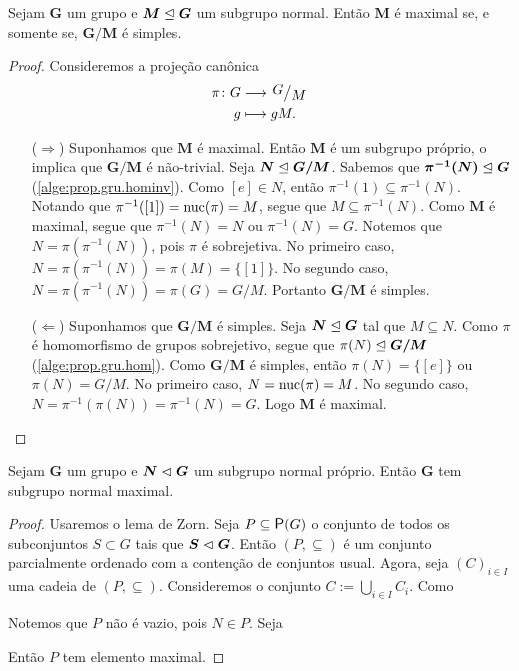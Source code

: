 \begin{proposition}
Sejam $\bm G$ um grupo e $\bm M \mathrel{\unlhd} \bm G$ um subgrupo normal. Então $\bm M$ é maximal se, e somente se, $\bm{G/M}$ é simples.
\end{proposition}
\begin{proof} Consideremos a projeção canônica
	\begin{align*}
	\func{\pi}{G}{\quo{G}{M}}{g}{gM}.
	\end{align*}
	\begin{enumerate}
		\item [($\Rightarrow$)] Suponhamos que $\bm M$ é maximal. Então $\bm M$ é um subgrupo próprio, o implica que $\bm{G/M}$ é não-trivial. Seja $\bm N \mathrel{\unlhd} \bm{G/M}$. Sabemos que $\bm{\pi^{-1}(N)} \mathrel{\unlhd} \bm G$ (\ref{alge:prop.gru.hominv}). Como $[e] \in N$, então $\pi^{-1}(1) \subseteq \pi^{-1}(N)$. Notando que $\pi^{-1}([1])=\operatorname{nuc}(\pi) = M$, segue que $M \subseteq \pi^{-1}(N)$. Como $\bm M$ é maximal, segue que $\pi^{-1}(N) = N$ ou $\pi^{-1}(N) = G$. Notemos que $N=\pi(\pi^{-1}(N))$, pois $\pi$ é sobrejetiva. No primeiro caso, $N = \pi(\pi^{-1}(N)) = \pi(M) = \{[1]\}$. No segundo caso, $N = \pi(\pi^{-1}(N)) = \pi(G) = G/M$. Portanto $\bm{G/M}$ é simples.
		
		\item [($\Leftarrow$)] Suponhamos que $\bm{G/M}$ é simples. Seja $\bm N \mathrel{\unlhd} \bm G$ tal que $M \subseteq N$. Como $\pi$ é homomorfismo de grupos sobrejetivo, segue que $\pi(N) \mathrel{\unlhd} \bm{G/M}$ (\ref{alge:prop.gru.hom}). Como $\bm{G/M}$ é simples, então $\pi(N) = \{[e]\}$ ou $\pi(N) = G/M$. No primeiro caso, $N = \operatorname{nuc}(\pi) = M$. No segundo caso, $N = \pi^{-1}(\pi(N)) = \pi^{-1}(N) = G$. Logo $\bm M$ é maximal.
	\end{enumerate}
\end{proof}

\begin{conjecture}
Sejam $\bm G$ um grupo e $\bm N \mathrel{\lhd} \bm G$ um subgrupo normal próprio. Então $\bm G$ tem subgrupo normal maximal.
\end{conjecture}
\begin{proof}
Usaremos o lema de Zorn. Seja $P \subseteq \p(G)$ o conjunto de todos os subconjuntos $S \subset G$ tais que $\bm S \mathrel{\lhd} \bm G$. Então $(P,\subseteq)$ é um conjunto parcialmente ordenado com a contenção de conjuntos usual. Agora, seja $(C)_{i \in I}$ uma cadeia de $(P,\subseteq)$. Consideremos o conjunto $C := \bigcup_{i \in I} C_i$. Como 

Notemos que $P$ não é vazio, pois $N \in P$. Seja



Então $P$ tem elemento maximal.
\end{proof}






